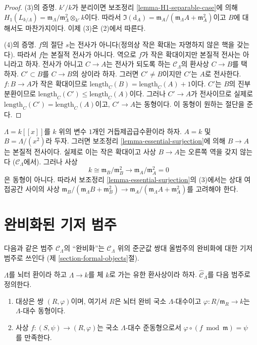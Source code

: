 \begin{proof}
\medskip\noindent
(3)의 증명.
$k'/k$가 분리이면 보조정리 \ref{lemma-H1-separable-case}에 의해
$H_1(L_{k/\Lambda}) =
\mathfrak m_\Lambda/\mathfrak m_\Lambda^2 \otimes_{k'} k$이다.
따라서 $\Im(\text{d}_A) =
\mathfrak m_A/(\mathfrak m_\Lambda A + \mathfrak m_A^2)$이고
$B$에 대해서도 마찬가지이다. 이제 (3)은 (2)에서 따른다.

\medskip\noindent
(4)의 증명. $f$의 절단 $s$는 전사가 아니다(정의상 작은 확대는 자명하지 않은
핵을 갖는다). 따라서 $f$는 본질적 전사가 아니다. 역으로 $f$가 작은
확대이지만 본질적 전사는 아니라고 하자. 전사가 아니고 $C \to A$는 전사가
되도록 하는 $\mathcal{C}_\Lambda$의 환사상
$C \to B$를 택하자. $C' \subset B$를 $C \to B$의 상이라 하자.
그러면 $C' \not = B$이지만 $C'$는 $A$로 전사한다.
$f : B \to A$가 작은 확대이므로
$\text{length}_C(B) = \text{length}_C(A) + 1$이다.
$C'$는 $B$의 진부분환이므로
$\text{length}_C(C') \leq \text{length}_C(A)$이다.
그러나 $C' \to A$가 전사이므로 실제로
$\text{length}_C(C') = \text{length}_C(A)$이고, $C' \to A$는 동형이다.
이 동형이 원하는 절단을 준다.
\end{proof}

\begin{example}
\label{example-essential-surjection}
$\Lambda = k[[x]]$를 $k$ 위의 변수 $1$개인 거듭제곱급수환이라 하자.
$A = k$ 및 $B = \Lambda/(x^2)$라 두자. 그러면 보조정리
\ref{lemma-essential-surjection}에 의해 $B \to A$는 본질적 전사이다.
실제로 이는 작은 확대이고 사상 $B \to A$는 오른쪽 역을 갖지 않는다
($\mathcal{C}_\Lambda$에서). 그러나 사상
$$
k \cong \mathfrak m_B/\mathfrak m_B^2
\longrightarrow
\mathfrak m_A/\mathfrak m_A^2 = 0
$$
은 동형이 아니다. 따라서 보조정리 \ref{lemma-essential-surjection}의 (3)에서는
상대 여접공간 사이의 사상
$\mathfrak m_B/(\mathfrak m_\Lambda B + \mathfrak m_B^2) \to
\mathfrak m_A/(\mathfrak m_\Lambda A + \mathfrak m_A^2)$를 고려해야 한다.
\end{example}
\section{완비화된 기저 범주}
\label{section-category-completion-CLambda}

\noindent
다음과 같은 범주 $\mathcal{C}_\Lambda$의 “완비화”는
$\mathcal{C}_\Lambda$ 위의 준군값 쌍대 올범주의 완비화에 대한
기저 범주로 쓰인다
(제 \ref{section-formal-objects}절).

\begin{definition}
\label{definition-completion-CLambda}
$\Lambda$를 뇌터 환이라 하고 $\Lambda \to k$를 체 $k$로 가는 유한
환사상이라 하자. {\it $\widehat{\mathcal{C}}_\Lambda$}를 다음 범주로
정의한다.
\begin{enumerate}
\item 대상은 쌍 $(R, \varphi)$이며, 여기서 $R$은 뇌터 완비 국소
$\Lambda$-대수이고 $\varphi : R/\mathfrak m_R \to k$는
$\Lambda$-대수 동형이다.
\item 사상 $f : (S, \psi) \to (R, \varphi)$는
국소 $\Lambda$-대수 준동형으로서
$\varphi \circ (f \bmod \mathfrak m) = \psi$를 만족한다.
\end{enumerate}
\end{definition}

